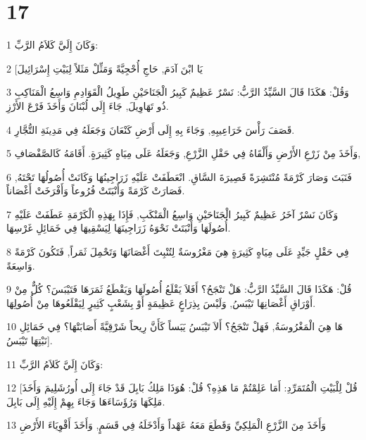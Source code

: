 \chapter{17}

\par 1 وَكَانَ إِلَيَّ كَلاَمُ الرَّبِّ:
\par 2 [يَا ابْنَ آدَمَ, حَاجِ أُحْجِيَّةً وَمَثِّلْ مَثَلاً لِبَيْتِ إِسْرَائِيلَ
\par 3 وَقُلْ: هَكَذَا قَالَ السَّيِّدُ الرَّبُّ: نَسْرٌ عَظِيمٌ كَبِيرُ الْجَنَاحَيْنِ طَوِيلُ الْقَوَادِمِ وَاسِعُ الْمَنَاكِبِ ذُو تَهَاوِيلَ, جَاءَ إِلَى لُبْنَانَ وَأَخَذَ فَرْعَ الأَرْزِ.
\par 4 قَصَفَ رَأْسَ خَرَاعِيبِهِ, وَجَاءَ بِهِ إِلَى أَرْضِ كَنْعَانَ وَجَعَلَهُ فِي مَدِينَةِ التُّجَّارِ.
\par 5 وَأَخَذَ مِنْ زَرْعِ الأَرْضِ وَأَلْقَاهُ فِي حَقْلِ الزَّرْعِ, وَجَعَلَهُ عَلَى مِيَاهٍ كَثِيرَةٍ. أَقَامَهُ كَالصَّفْصَافِ,
\par 6 فَنَبَتَ وَصَارَ كَرْمَةً مُنْتَشِرَةً قَصِيرَةَ السَّاقِ. انْعَطَفَتْ عَلَيْهِ زَرَاجِينُهَا وَكَانَتْ أُصُولُهَا تَحْتَهُ, فَصَارَتْ كَرْمَةً وَأَنْبَتَتْ فُرُوعاً وَأَفْرَخَتْ أَغْصَاناً.
\par 7 وَكَانَ نَسْرٌ آخَرُ عَظِيمٌ كَبِيرُ الْجَنَاحَيْنِ وَاسِعُ الْمَنْكَبِ, فَإِذَا بِهَذِهِ الْكَرْمَةِ عَطَفَتْ عَلَيْهِ أُصُولَهَا وَأَنْبَتَتْ نَحْوَهُ زَرَاجِينَهَا لِيَسْقِيهَا فِي خَمَائِلِ غَرْسِهَا.
\par 8 فِي حَقْلٍ جَيِّدٍ عَلَى مِيَاهٍ كَثِيرَةٍ هِيَ مَغْرُوسَةٌ لِتُنْبِتَ أَغْصَانَهَا وَتَحْمِلَ ثَمَراً, فَتَكُونَ كَرْمَةً وَاسِعَةً.
\par 9 قُلْ: هَكَذَا قَالَ السَّيِّدُ الرَّبُّ: هَلْ تَنْجَحُ؟ أَفَلاَ يَقْلَعُ أُصُولَهَا وَيَقْطَعُ ثَمَرَهَا فَتَيْبَسَ؟ كُلٌّ مِنْ أَوْرَاقِ أَغْصَانِهَا تَيْبَسُ, وَلَيْسَ بِذِرَاعٍ عَظِيمَةٍ أَوْ بِشَعْبٍ كَثِيرٍ لِيَقْلَعُوهَا مِنْ أُصُولِهَا.
\par 10 هَا هِيَ الْمَغْرُوسَةُ, فَهَلْ تَنْجَحُ؟ أَلاَ تَيْبَسُ يَبَساً كَأَنَّ رِيحاً شَرْقِيَّةً أَصَابَتْهَا؟ فِي خَمَائِلِ نَبْتِهَا تَيْبَسُ].
\par 11 وَكَانَ إِلَيَّ كَلاَمُ الرَّبِّ:
\par 12 [قُلْ لِلْبَيْتِ الْمُتَمَرِّدِ: أَمَا عَلِمْتُمْ مَا هَذِهِ؟ قُلْ: هُوَذَا مَلِكُ بَابِلَ قَدْ جَاءَ إِلَى أُورُشَلِيمَ وَأَخَذَ مَلِكَهَا وَرُؤَسَاءَهَا وَجَاءَ بِهِمْ إِلَيْهِ إِلَى بَابِلَ.
\par 13 وَأَخَذَ مِنَ الزَّرْعِ الْمَلِكِيِّ وَقَطَعَ مَعَهُ عَهْداً وَأَدْخَلَهُ فِي قَسَمٍ, وَأَخَذَ أَقْوِيَاءَ الأَرْضِ
